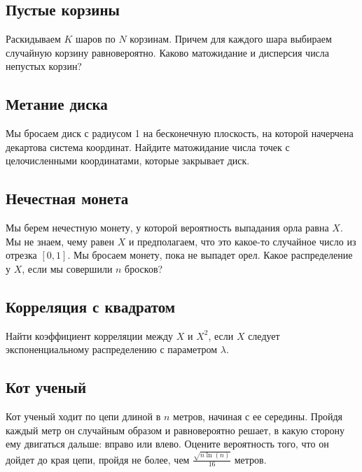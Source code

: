 \documentclass[12pt]{article}
\begin{document}
\subsection{Пустые корзины}

Раскидываем $K$ шаров по $N$ корзинам. Причем для каждого шара выбираем случайную корзину равновероятно. Каково матожидание и дисперсия числа непустых корзин?



\subsection{Метание диска}

Мы бросаем диск с радиусом 1 на бесконечную плоскость, на которой начерчена декартова система координат. Найдите матожидание числа точек с целочисленными координатами, которые закрывает диск.



\subsection{Нечестная монета}

Мы берем нечестную монету, у которой вероятность выпадания орла равна $X$. Мы не знаем, чему равен $X$ и предполагаем, что это какое-то случайное число из отрезка $[0, 1]$. Мы бросаем монету, пока не выпадет орел. Какое распределение у $X$, если мы совершили $n$ бросков?



\subsection{Корреляция с квадратом}

Найти коэффициент корреляции между $X$ и $X^2$, если $X$ следует экспоненциальному распределению с параметром $\lambda$.



\subsection{Кот ученый}

Кот ученый ходит по цепи длиной в $n$ метров, начиная с ее середины. Пройдя каждый метр он случайным образом и равновероятно решает, в какую сторону ему двигаться дальше: вправо или влево. Оцените вероятность того, что он дойдет до края цепи, пройдя не более, чем $\frac{\sqrt{n \ln(n)}}{16}$ метров.
\end{document}
